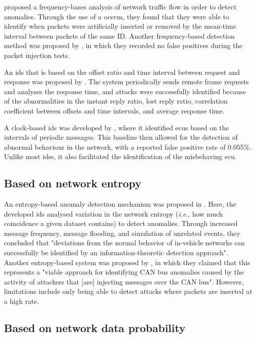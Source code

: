 \cite{taylor2015frequency} proposed a frequency-bases analysis of network traffic flow in order to detect anomalies. Through the use of a \gls{ocsvm}, they found that they were able to identify when packets were artificially inserted or removed by the mean-time interval between packets of the same ID. Another frequency-based detection method was proposed by \cite{song2016intrusion}, in which they recorded no false positives during the packet injection tests.\par
An \gls{ids} that is based on the offset ratio and time interval between request and response was proposed by \cite{lee2017otids}. The system periodically sends remote frame requests and analyses the response time, and attacks were successfully identified because of the abnormalities in the instant reply ratio, lost reply ratio, correlation coefficient between offsets and time intervals, and average response time.\par
A clock-based \gls{ids} was developed by \cite{cho2016fingerprinting}, where it identified \glspl{ecu} based on the intervals of periodic messages. This baseline then allowed for the detection of abnormal behaviour in the network, with a reported false positive rate of 0.055\%. Unlike most \glspl{ids}, it also facilitated the identification of the misbehaving \gls{ecu}.

\subsection{Based on network entropy}

An entropy-based anomaly detection mechanism was proposed in \cite{muter2011entropy}. Here, the developed \gls{ids} analysed variation in the network entropy (\textit{i.e.}, how much coincidence a given dataset contains) to detect anomalies. Through increased message frequency, message flooding, and simulation of unrelated events, they concluded that "deviations from the normal behavior of in-vehicle networks can successfully be identified by an information-theoretic detection approach". Another entropy-based system was proposed by \cite{marchetti2016evaluation}, in which they claimed that this represents a "viable approach for identifying CAN bus anomalies caused by the activity of attackers that [are] injecting messages over the CAN bus". However, limitations include only being able to detect attacks where packets are inserted at a high rate.

\subsection{Based on network data probability}

